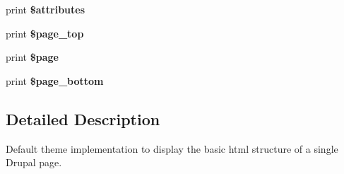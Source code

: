 \begin{DoxyCompactItemize}
\item 
\hypertarget{html_8tpl_8php_a9c88c4272fa40546577b45392a0b3cd3}{
print {\bfseries \$attributes}}
\label{html_8tpl_8php_a9c88c4272fa40546577b45392a0b3cd3}

\item 
\hypertarget{html_8tpl_8php_aafe3d8568482436044136d4ef94f2c11}{
print {\bfseries \$page\_\-top}}
\label{html_8tpl_8php_aafe3d8568482436044136d4ef94f2c11}

\item 
\hypertarget{html_8tpl_8php_aa0fd4542b316ecf8a64050c479b7227c}{
print {\bfseries \$page}}
\label{html_8tpl_8php_aa0fd4542b316ecf8a64050c479b7227c}

\item 
\hypertarget{html_8tpl_8php_afd5b85d1c3433f5fd7c137b6c29c20f9}{
print {\bfseries \$page\_\-bottom}}
\label{html_8tpl_8php_afd5b85d1c3433f5fd7c137b6c29c20f9}

\end{DoxyCompactItemize}


\subsection{Detailed Description}
Default theme implementation to display the basic html structure of a single Drupal page.

